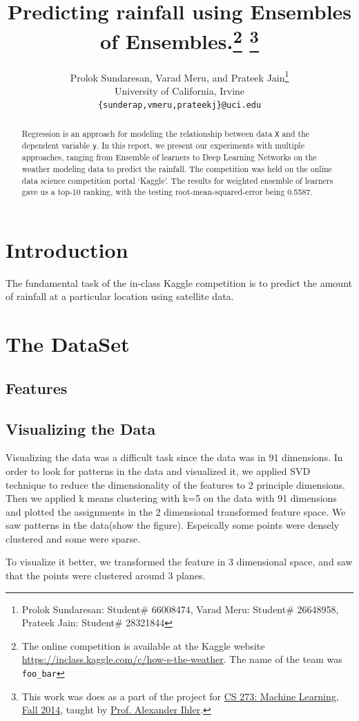 \documentclass[a4paper]{article}
\title{{Predicting rainfall using Ensembles of Ensembles.\footnote{The online competition is available at the Kaggle website \href{https://inclass.kaggle.com/c/how-s-the-weather}{\url{https://inclass.kaggle.com/c/how-s-the-weather}}. The name of the team was \texttt{foo\_bar}}
}\footnote{This work was does as a part of the project for  \href{http://sli.ics.uci.edu/Classes/2015W-273a}{CS 273: Machine Learning, Fall 2014}, taught by \href{http://www.ics.uci.edu/~ihler/}{Prof. Alexander Ihler}.}}
\author{{Prolok Sundaresan, Varad Meru, and Prateek Jain}\footnote{Prolok Sundaresan: Student\# 66008474, Varad Meru: Student\# 26648958, Prateek Jain: Student\# 28321844}\\
  University of California, Irvine\\
  \texttt{\{sunderap,vmeru,prateekj\}@uci.edu}}
\date{}
\begin{document}
\maketitle

\begin{abstract}
Regression is an approach for modeling the relationship between data \texttt{X} and the dependent variable \texttt{y}. In this report, we present our experiments with multiple approaches, ranging from Ensemble of learners to Deep Learning Networks on the weather modeling data to predict the rainfall. The competition was held on the online data science competition portal `Kaggle'. The results for weighted ensemble of learners gave us a top-10 ranking, with the testing root-mean-squared-error being 0.5587.
\end{abstract}

\section{Introduction}
The fundamental task of the in-class Kaggle competition is to predict the amount of rainfall at a particular location using satellite data.


\section{The DataSet}
\label{sec:dataset}

\subsection{Features}

\subsection{Visualizing the Data}
Visualizing the data was a difficult task since the data was in 91 dimensions.
In order to look for patterns in the data and visualized it, we applied SVD technique to reduce the dimensionality of the features to 2 principle dimensions. Then we applied k means clustering with k=5 on the data with 91 dimensions and plotted the assignments in the 2 dimensional transformed feature space. We saw patterns in the data(show the figure). Espeically some points were densely clustered and some were sparse.

To visualize it better, we transformed the feature in 3 dimensional space, and saw that the points were clustered around 3 planes.
\end{document}
